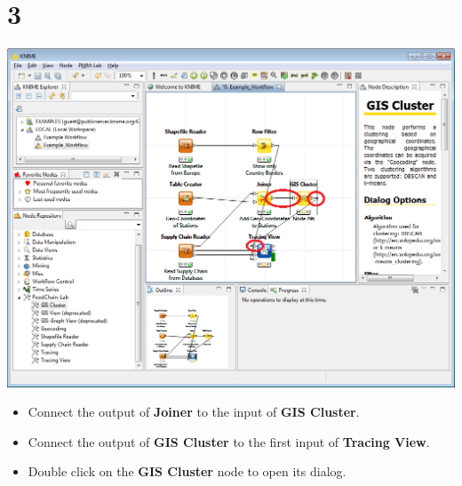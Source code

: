 \documentclass{beamer}
\begin{document}
\section{3}
\begin{frame}
	\begin{center}
  		\includegraphics[height=0.6\textheight]{3.png}
	\end{center}
	\begin{itemize}
		\item Connect the output of \textbf{Joiner} to the input of \textbf{GIS Cluster}.
		\item Connect the output of \textbf{GIS Cluster} to the first input of \textbf{Tracing View}.
		\item Double click on the \textbf{GIS Cluster} node to open its dialog.
	\end{itemize}
\end{frame}
\end{document}
